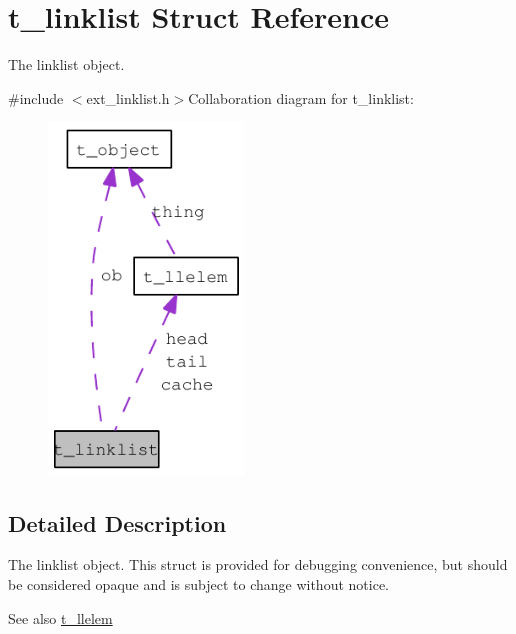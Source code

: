 \hypertarget{structt__linklist}{
\section{t\_\-linklist Struct Reference}
\label{structt__linklist}
}


The linklist object.  


{\ttfamily \#include $<$ext\_\-linklist.h$>$}Collaboration diagram for t\_\-linklist:\nopagebreak
\begin{figure}[H]
\begin{center}
\leavevmode
\includegraphics[width=147pt]{structt__linklist__coll__graph}
\end{center}
\end{figure}


\subsection{Detailed Description}
The linklist object. This struct is provided for debugging convenience, but should be considered opaque and is subject to change without notice.

\begin{DoxySeeAlso}{See also}
\hyperlink{structt__llelem}{t\_\-llelem} 
\end{DoxySeeAlso}
